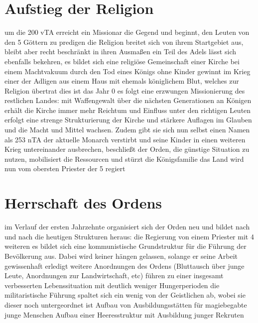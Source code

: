 \section{Aufstieg der Religion}
\begin{outline}
	\1 um die 200 vTA erreicht ein Missionar die Gegend und beginnt, den Leuten von den 5 Göttern zu predigen
	\1 die Religion breitet sich von ihrem Startgebiet aus, bleibt aber recht beschränkt in ihren Ausmaßen
	\1 ein Teil des Adels lässt sich ebenfalls bekehren, es bildet sich eine religiöse Gemeinschaft einer Kirche
	\1 bei einem Machtvakuum durch den Tod eines Königs ohne Kinder gewinnt im Krieg einer der Adligen aus einem Haus mit ehemals königlichem Blut, welches zur Religion übertrat
	\1 dies ist das Jahr 0
	\1 es folgt eine erzwungen Missionierung des restlichen Landes: mit Waffengewalt
	\1 über die nächsten Generationen an Königen erhält die Kirche immer mehr Reichtum und Einfluss
	\1 unter den richtigen Leuten erfolgt eine strenge Strukturierung der Kirche und stärkere Auflagen im Glauben und die Macht und Mittel wachsen. Zudem gibt sie sich nun selbst einen Namen
	\1 als 253 nTA der aktuelle Monarch verstirbt und seine Kinder in einen weiteren Krieg untereinander ausbrechen, beschließt der Orden, die günstige Situation zu nutzen, mobilisiert die Ressourcen und stürzt die Königsfamilie
	\1 das Land wird nun vom obersten Priester der 5 regiert
\end{outline}

\section{Herrschaft des Ordens}
\begin{outline}
	\1 im Verlauf der ersten Jahrzehnte organisiert sich der Orden neu und bildet nach und nach die heutigen Strukturen heraus: die Regierung von einem Priester mit 4 weiteren
	\1 es bildet sich eine kommunistische Grundstruktur für die Führung der Bevölkerung aus. Dabei wird keiner hängen gelassen, solange er seine Arbeit gewissenhaft erledigt
	\1 weitere Anordnungen des Ordens (Bluttausch über junge Leute, Anordnungen zur Landwirtschaft, etc) führen zu einer insgesamt verbesserten Lebenssituation mit deutlich weniger Hungerperioden
	\1 die militaristische Führung spaltet sich ein wenig von der Geistlichen ab, wobei sie dieser noch untergeordnet ist
	\1 Aufbau von Ausbildungsstätten für magiebegabte junge Menschen
	\1 Aufbau einer Heeresstruktur mit Ausbildung junger Rekruten
\end{outline}

